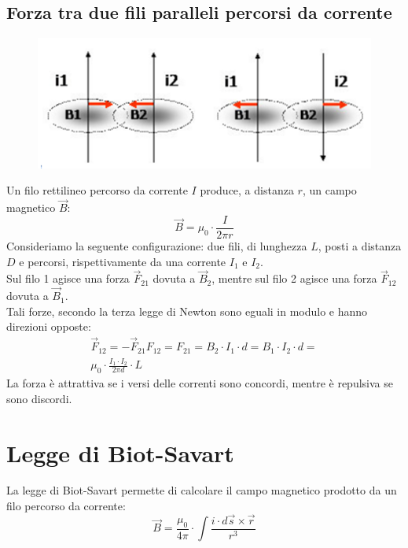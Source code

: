 \subsection{Forza tra due fili paralleli percorsi da corrente}
\begin{figure}[h!]
	\centering
    \includegraphics[scale=0.7]{Pictures/fili-paralleli-corrente.png}
\end{figure}
Un filo rettilineo percorso da corrente $I$ produce, a distanza $r$, un campo magnetico $\vec{B}$:
\begin{displaymath}
	\vec{B} = \mu_0 \cdot \frac{I}{2\pi r}
\end{displaymath}
Consideriamo la seguente configurazione: due fili, di lunghezza $L$, posti a distanza $D$ e percorsi, rispettivamente da una corrente $I_1$ e $I_2$.\\
Sul filo 1 agisce una forza $\vec{F}_{21}$ dovuta a $\vec{B}_2$, mentre sul filo 2 agisce una forza $\vec{F}_{12}$ dovuta a $\vec{B}_1$.\\
Tali forze, secondo la terza legge di Newton sono eguali in modulo e hanno direzioni opposte:
\begin{displaymath}\begin{aligned}
	\vec{F}_{12} = - \vec{F}_{21}
    F_{12} = F_{21} = B_2 \cdot I_1 \cdot d = B_1 \cdot I_2 \cdot d =\\ 
    \mu_0 \cdot \frac{I_1 \cdot I_2}{2 \pi d} \cdot L
\end{aligned}\end{displaymath}
La forza è attrattiva se i versi delle correnti sono concordi, mentre è repulsiva se sono discordi.

\section{Legge di Biot-Savart}
La legge di Biot-Savart permette di calcolare il campo magnetico prodotto da un filo percorso da corrente:
\begin{displaymath}
	\vec{B} = \frac{\mu_0}{4\pi} \cdot \int \frac{i \cdot d\vec{s} \times \vec{r}}{r^3}
\end{displaymath}

